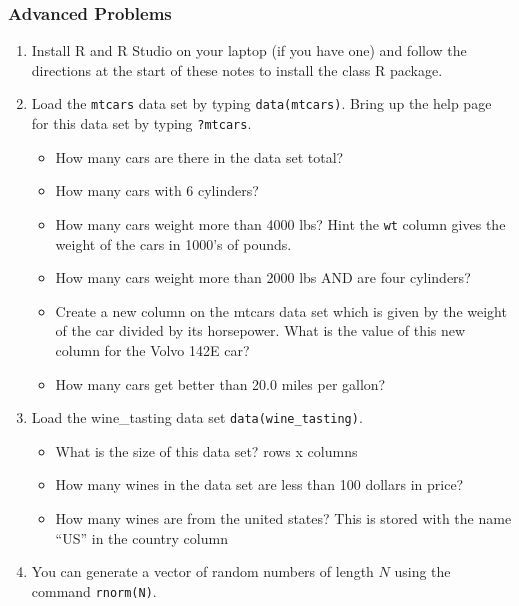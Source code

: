 \documentclass[
]{book}
\providecommand{\tightlist}{%
  \setlength{\itemsep}{0pt}\setlength{\parskip}{0pt}}
\theoremstyle{definition}
\theoremstyle{definition}
\theoremstyle{definition}
\theoremstyle{definition}
\theoremstyle{remark}
\begin{document}
\hypertarget{advanced-problems}{%
\subsubsection{Advanced Problems}\label{advanced-problems}}

\begin{enumerate}
\def\labelenumi{\arabic{enumi}.}
\item
  Install R and R Studio on your laptop (if you have one) and follow the directions at the start of these notes to install the class R package.
\item
  Load the \texttt{mtcars} data set by typing \texttt{data(mtcars)}. Bring up the help page for this data set by typing \texttt{?mtcars}.

  \begin{itemize}
  \tightlist
  \item
    How many cars are there in the data set total?
  \item
    How many cars with 6 cylinders?
  \item
    How many cars weight more than 4000 lbs? Hint the \texttt{wt} column gives the weight of the cars in 1000's of pounds.
  \item
    How many cars weight more than 2000 lbs AND are four cylinders?
  \item
    Create a new column on the mtcars data set which is given by the weight of the car divided by its horsepower. What is the value of this new column for the Volvo 142E car?
  \item
    How many cars get better than 20.0 miles per gallon?
  \end{itemize}
\item
  Load the wine\_tasting data set \texttt{data(wine\_tasting)}.

  \begin{itemize}
  \tightlist
  \item
    What is the size of this data set? rows x columns
  \item
    How many wines in the data set are less than 100 dollars in price?
  \item
    How many wines are from the united states? This is stored with the name ``US'' in the country column
  \end{itemize}
\item
  You can generate a vector of random numbers of length \(N\) using the command \texttt{rnorm(N)}.


\end{enumerate}
\end{document}
